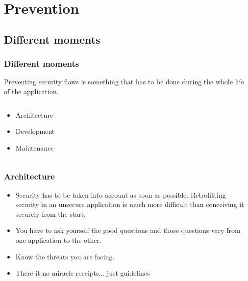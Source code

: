 \section{Prevention}

\subsection{Different moments}

\begin{frame}
\frametitle{Different moments}
Preventing security flaws is something that has to be done during the
whole life of the application.
\begin{columns}
\begin{column}{0.5\textwidth}
\begin{itemize}
\item Architecture
\item Development
\item Maintenance
\end{itemize}
\end{column}
\begin{column}{0.5\textwidth}
\end{column}
\end{columns}
\end{frame}

\begin{frame}
\frametitle{Architecture}
\begin{itemize}
\item Security has to be taken into account as soon as
  possible. Retrofitting security in an unsecure application is much
  more difficult than conceiving it securely from the start.
\item You have to ask yourself the good questions and those questions
  vary from one application to the other.
\item Know the threats you are facing.
\item There it no miracle receipts... just guidelines
\end{itemize}
\end{frame}

